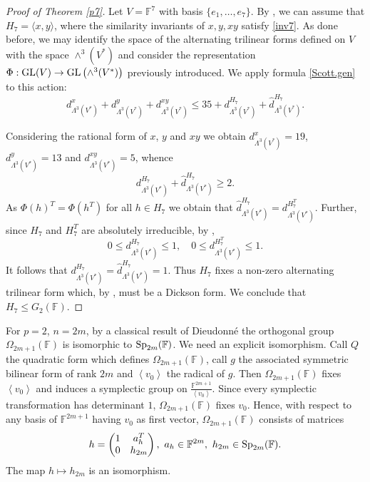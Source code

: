 \documentclass{amsart}
\theoremstyle{remark}
\begin{document}
\bigskip

\begin{proof}[Proof of Theorem \emph{\ref{p7}}]
Let $V={\mathbb{F}}^7$ with basis $\{e_1,\ldots,e_7\}$. 
By \cite{TV2}, we can assume that $H_7=\langle x,y\rangle$, where the similarity
invariants
of $x,y,xy$
satisfy \eqref{inv7}. As done before, we may identify the 
space of the alternating trilinear forms defined on $V$ with the space $\wedge^3
(V^\ast)$ and consider the representation $\Phi: {\mathop{\rm GL}\nolimits}(V)\rightarrow {\mathop{\rm GL}\nolimits}\left(\wedge^3
(V^\ast)\right)$ previously introduced. 
We apply formula \eqref{Scott.gen} to this action:
$$d_{\Lambda^ 3(V^\ast)}^ x+d_{\Lambda^ 3(V^\ast)}^ y+d_{\Lambda^ 3(V^\ast)}^{xy} \leq 35
+ d_{\Lambda^ 3(V^\ast)}^{H_7}+\hat d_{\Lambda^ 3(V^\ast)}^{H_7}.$$

Considering the rational form of $x$, $y$ and $xy$ we obtain $d_{\Lambda^ 3(V^\ast)}^ x=
19$, $d_{\Lambda^ 3(V^\ast)}^ y= 13$ and $d_{\Lambda^
3(V^\ast)}^{xy}=5$, whence 
$$d_{\Lambda^ 3(V^\ast)}^{H_7}+\hat d_{\Lambda^ 3(V^\ast)}^{H_7} \geq 2.$$
As $\Phi(h)^T=\Phi(h^T)$ for all $h\in H_7$ we obtain that $ \hat d_{\Lambda^
3(V^\ast)}^{H_7}= d_{\Lambda^ 3(V^\ast)}^{H_7^T}$.
Further, since $H_7$ and $H_7^T$ are absolutely irreducible, by \cite[Theorem 5(2)]{A}, 
$$0\leq d_{\Lambda^ 3(V^\ast)}^ {H_7}\le 1, \quad  0\le d_{\Lambda^ 3(V^\ast)}^{H_7^T}\leq 1.$$
It follows that  $d_{\Lambda^ 3(V^\ast)}^ {H_7}= \hat d_{\Lambda^ 3(V^\ast)}^{H_7}=1$.
Thus $H_7$ fixes a non-zero alternating trilinear form which, by \cite[Theorem 5(5)]{A}, must be a Dickson form.
We conclude that $H_7\leq G_2({\mathbb{F}})$.
\end{proof}

For $p=2$, $n=2m$, by a classical result of Dieudonn\'e \cite{Dieu} the orthogonal group
$\Omega_{2m+1}({\mathbb{F}})$
is isomorphic to ${\mathop{\rm Sp}\nolimits}_{2m}({\mathbb{F}})$. We need an explicit isomorphism.
Call  $Q$ the quadratic form  which defines $\Omega_{2m+1}({\mathbb{F}})$,  call
$g$ the associated  symmetric bilinear form  of rank $2m$ and 
$\left\langle v_0\right\rangle$ the radical of $g$. Then $\Omega_{2m+1}({\mathbb{F}})$ fixes $\left\langle v_0\right\rangle$
and induces a symplectic group on $\frac{{\mathbb{F}}^{2m+1}}{\left\langle v_0\right\rangle}$.
Since every symplectic transformation has determinant $1$,  $\Omega_{2m+1}({\mathbb{F}})$ fixes $v_0$.
Hence, with respect to any basis of ${\mathbb{F}}^{2m+1}$ having $v_0$ as first vector, $\Omega_{2m+1}({\mathbb{F}})$ consists of
matrices 
\begin{equation}\label{Omega7}
h=\begin{pmatrix} 1 & a_{h}^T \\ 0 &  h_{2m} \end{pmatrix},\ 
a_h\in {\mathbb{F}}^{2m}, \ h_{2m}\in {\mathop{\rm Sp}\nolimits}_{2m}({\mathbb{F}}).
\end{equation}
The map $h\mapsto h_{2m}$ is an isomorphism.
\end{document}
